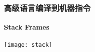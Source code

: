 \begin{frame}
	\frametitle{高级语言编译到机器指令}
	\framesubtitle{Stack Frames}
\small 
	
	\centering
	\texttt{[image: stack]}
	
	
\end{frame}




